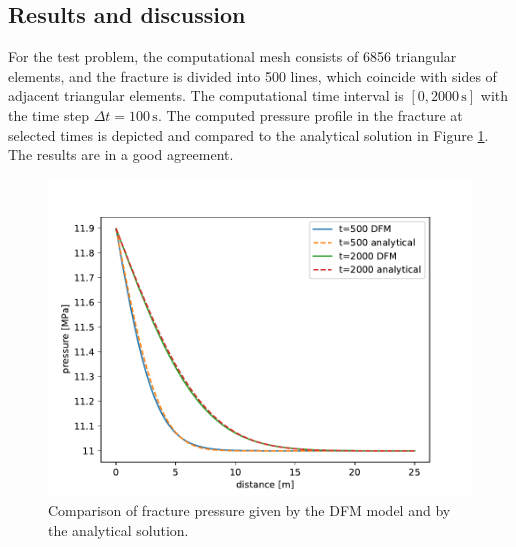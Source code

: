 \documentclass[a4paper]{article}
\numberwithin{equation}{section}
\begin{document}
\subsection{Results and discussion}
For the test problem, the computational mesh consists of 6856 triangular elements, and the fracture is divided into 500 lines, which coincide with sides of adjacent triangular elements.
The computational time interval is $[0,2000\,\mbox{s}]$ with the time step $\Delta t=100\,\mbox{s}$.
% 
The computed pressure profile in the fracture at selected times is depicted and compared to the analytical solution in Figure \ref{fig:test_solution}.
The results are in a good agreement.
\begin{figure}[h]
\centering
\includegraphics[width=\textwidth,ext=.png]{figures/conv_result_linear_dt_100_cond_9p81e-18_Er_6e+10_Ef_1e+06_nur_0_nuf_0_beta_1_pressure.pdf}
\caption{Comparison of fracture pressure given by the DFM model and by the analytical solution.}
\label{fig:test_solution}
\end{figure}
\end{document}
